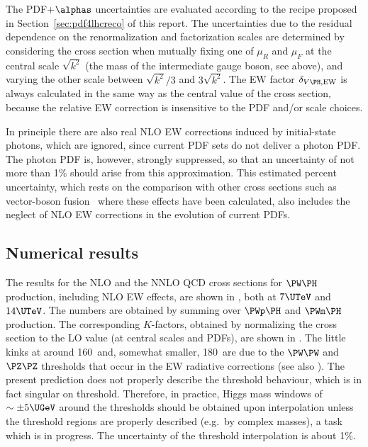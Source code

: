 The PDF+$\alphas$ uncertainties are evaluated according to the recipe
proposed in Section~\ref{sec:pdf4lhcreco} of this report. The
uncertainties due to the residual dependence on the renormalization and
factorization scales are determined by considering the cross section
when mutually fixing one of $\mu_R$ and $\mu_F$ at the central scale
$\sqrt{k^2}$ (the mass of the intermediate gauge boson, see above), and varying
the other scale between $\sqrt{k^2}/3$ and $3\sqrt{k^2}$.
The EW factor $\delta_{V\PH,\rm EW}$ is always calculated in the same way as
the central value of the cross section, because the relative EW correction
is insensitive to the PDF and/or scale choices.

In principle there are also real NLO EW corrections induced by
initial-state photons, which are ignored, since current PDF sets do not
deliver a photon PDF.  The photon PDF is, however, strongly suppressed,
so that an uncertainty of not more than 1\% should arise from this
approximation.  This estimated percent uncertainty, which rests on the
comparison with other cross sections such as vector-boson
fusion~\cite{Ciccolini:2007ec,Ciccolini:2007jr} where these effects have
been calculated, also includes the neglect of NLO EW corrections in the
evolution of current PDFs.

\subsection{Numerical results}

The results for the NLO and the NNLO QCD cross sections for $\PW\PH$
production, including NLO EW effects, are shown in
, both at $7\UTeV$ and $14\UTeV$. The numbers are obtained
by summing over $\PWp\PH$ and $\PWm\PH$ production.
The corresponding $K$-factors, obtained by normalizing the cross section
to the LO value (at central scales and PDFs), are shown in
. The little kinks at around 160\UGeV\ and, somewhat
smaller, 180\UGeV\ are due to the $\PW\PW$ and $\PZ\PZ$ thresholds that occur
in the EW radiative corrections (see also ).
The present prediction does not properly describe the threshold
behaviour, which is in fact singular on threshold. Therefore, 
in practice, Higgs mass windows of $\sim \pm 5\UGeV$ around the 
thresholds should be obtained upon
interpolation unless the threshold regions are properly described
(e.g.\ by complex masses), a task which is in progress.
The uncertainty of the threshold interpolation is about 1\%.

